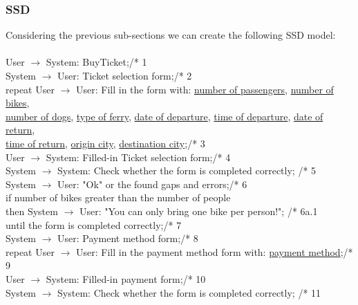 \subsubsection{SSD}
\creator{\studentA}
Considering the previous sub-sections we can create the following SSD model:\\\\
User $\rightarrow$ System: BuyTicket;\hfill /* 1\\
System $\rightarrow$ User: Ticket selection form;\hfill /* 2\\
repeat User $\rightarrow$ User: Fill in the form with: \underline{number of passengers}, \underline{number of bikes},\\ \underline{number of dogs}, \underline{type of ferry}, \underline{date of departure}, \underline{time of departure}, \underline{date of return},\\ \underline{time of return}, \underline{origin city}, \underline{destination city};\hfill /* 3\\
\phantom{x}\hspace{7mm} User $\rightarrow$ System: Filled-in Ticket selection form;\hfill /* 4\\
\phantom{x}\hspace{7mm} System $\rightarrow$ System: Check whether the form is completed correctly; \hfill /* 5\\
\phantom{x}\hspace{7mm} System $\rightarrow$ User: "Ok" or the found gaps and errors;\hfill /* 6\\
\phantom{x}\hspace{7mm} if number of bikes greater than the number of people\\
\phantom{x}\hspace{14mm} then System $\rightarrow$ User: "You can only bring one bike per person!"; \hfill /* 6a.1\\
until the form is completed correctly;\hfill /* 7\\
System $\rightarrow$ User: Payment method form;\hfill /* 8\\
repeat User $\rightarrow$ User: Fill in the payment method form with: \underline{payment method};\hfill /* 9\\
\phantom{x}\hspace{7mm} User $\rightarrow$ System: Filled-in payment form;\hfill /* 10\\
\phantom{x}\hspace{7mm} System $\rightarrow$ System: Check whether the form is completed correctly; \hfill /* 11\\
